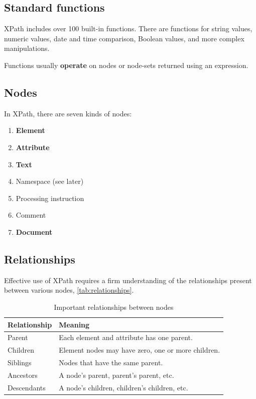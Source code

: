 \documentclass{pgnotes}
\begin{document}
\subsection{Standard functions}

XPath includes over 100 built-in functions.
There are functions for string values, numeric values, date and time comparison, Boolean values, and more complex manipulations.
  
Functions usually \textbf{operate} on nodes or node-sets returned using an expression. 


\subsection{Nodes}

In XPath, there are seven kinds of nodes:

\begin{enumerate}
\item \textbf{Element}
\item \textbf{Attribute}
\item \textbf{Text}
\item Namespace (see later)
\item Processing instruction 
\item Comment
\item \textbf{Document}
\end{enumerate}


\subsection{Relationships}

Effective use of XPath requires a firm understanding of the relationships present between various nodes, \autoref{tab:relationships}.

\begin{table}[htbp]
  \centering
  \begin{tabularx}{1.0\linewidth}{l X}
    \toprule
    \textbf{Relationship} & \textbf{Meaning} \\
    \midrule
    Parent & Each element and attribute has one parent. \\
    Children & Element nodes may have zero, one or more children. \\
    Siblings & Nodes that have the same parent. \\
    Ancestors & A node's parent, parent's parent, etc. \\
    Descendants & A node's children, children's children, etc. \\
    \bottomrule
  \end{tabularx}
  \caption{Important relationships between nodes}
  \label{tab:relationships} 
\end{table}
\end{document}
